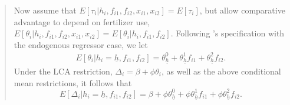 \documentclass{article}[11pt]
\begin{document}
\begin{enumerate}
\begin{itemize}
\begin{quote}
Now assume that $E[\tau_i|h_i,f_{i1},f_{i2},x_{i1},x_{i2}]=E[\tau_i]$, but allow comparative advantage to depend on fertilizer use,  $E[\theta_i|h_{i},f_{i1},f_{i2},x_{i1},x_{i2}]=E[\theta_i|h_i,f_{i1},f_{i2}]$. Following \citet{S2011}'s specification with the endogenous regressor case, we let
\begin{eqnarray}E[\theta_i|h_i=\underline{h},f_{i1},f_{i2}]=\theta_{\underline{h}}^0+\theta_{\underline{h}}^{1}f_{i1}+\theta_{\underline{h}}^{2}f_{i2}.\label{eq:theta_proj_hf}\end{eqnarray}
Under the LCA restriction, $\Delta_i=\beta+\phi \theta_i$, as well as the above conditional mean restrictions, it follows that 
$$E[\Delta_i|h_i=\underline{h},f_{i1},f_{i2}]=\beta+\phi\theta_{\underline{h}}^0+\phi\theta_{\underline{h}}^{1}f_{i1}+\phi\theta_{\underline{h}}^{2}f_{i2}.$$


\end{quote}
\end{itemize}
\end{enumerate}
\end{document}
